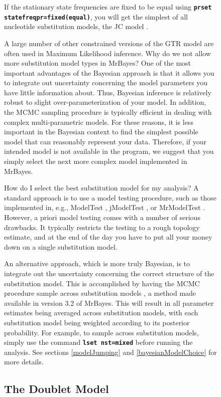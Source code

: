\documentclass[12pt]{book}
\newcommand{\ttt}[1]{\texttt{#1}}
\newcommand{\tb}[1]{\ttt{\textbf{#1}}}
\begin{document}
\begin{figure}[h]
If the stationary state frequencies are fixed to be equal using \tb{prset
statefreqpr=fixed(equal)}, you will get the simplest of all nucleotide substitution models, the JC
model \citep{jukes69}.

A large number of other constrained versions of the GTR model are often used in Maximum Likelihood
inference. Why do we not allow more substitution model types in MrBayes? One of the most important
advantages of the Bayesian approach is that it allows you to integrate out uncertainty concerning
the model parameters you have little information about. Thus, Bayesian inference is relatively
robust to slight over-parameterization of your model. In addition, the MCMC sampling procedure is
typically efficient in dealing with complex multi-parametric models. For these reasons, it is less
important in the Bayesian context to find the simplest possible model that can reasonably represent
your data. Therefore, if your intended model is not available in the program, we suggest that you
simply select the next more complex model implemented in MrBayes.

How do I select the best substitution model for my analysis? A standard approach is to use a model
testing procedure, such as those implemented in, e.g., ModelTest \citep{posada98}, jModelTest
\citep{posada08}, or MrModelTest \citep{nylander04b}. However, a priori model testing comes with a
number of serious drawbacks. It typically restricts the testing to a rough topology estimate, and
at the end of the day you have to put all your money down on a single substitution model.

An alternative approach, which is more truly Bayesian, is to integrate out the uncertainty
concerning the correct structure of the substitution model. This is accomplished by having the MCMC
procedure sample across substitution models \citep{huelsenbeck04d}, a method made available in
version 3.2 of MrBayes. This will result in all parameter estimates being averaged across
substitution models, with each substitution model being weighted according to its posterior
probability. For example, to sample across substitution models, simply use the command \tb{lset
nst=mixed} before running the analysis. See sections \ref{modelJumping} and
\ref{bayesianModelChoice} for more details.

\subsection{The Doublet Model}


\end{figure}
\end{document}
